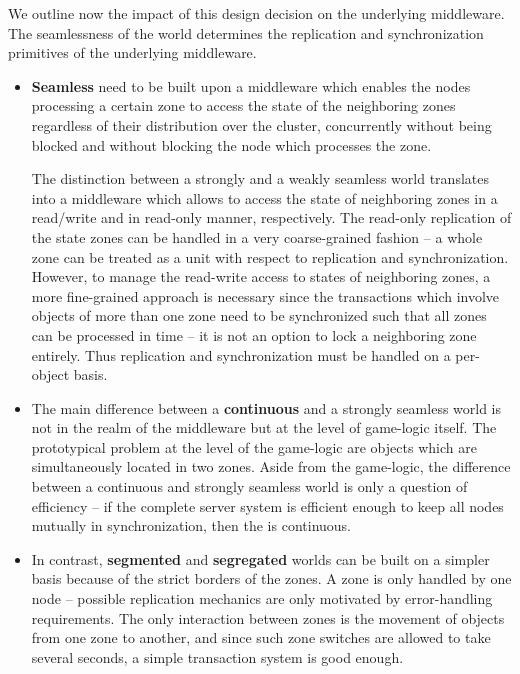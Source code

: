 \documentclass[a4paper, 10pt]{book}
\begin{document}
            We outline now the impact of this design decision on the underlying
            middleware. The seamlessness of the world determines the replication
            and synchronization primitives of the underlying middleware. 
            \begin{itemize}
                \item {\bf Seamless} \MMORGS need to be built upon a
                    middleware which enables the nodes processing a certain zone to access
                    the state of the neighboring zones regardless of their distribution
                    over the cluster, concurrently without being blocked and without
                    blocking the node which processes the zone.

                    The distinction between a strongly and a weakly seamless world
                    translates into a middleware which allows to access the state of
                    neighboring zones in a read/write and in read-only manner,
                    respectively.
                    The read-only replication of the state zones can be handled in a
                    very coarse-grained fashion -- a whole zone can be treated as a unit
                    with respect to replication and synchronization.\\
                    However, to manage the read-write access to states of neighboring
                    zones, a more fine-grained approach is necessary since the
                    transactions which involve objects of more than one zone need to be
                    synchronized such that all zones can be processed in time -- it is
                    not an option to lock a neighboring zone entirely. Thus replication
                    and synchronization must be handled on a per-object basis.
                \item The main difference between a \textbf{continuous} and a strongly
                    seamless world is not in the realm of the middleware but at the
                    level of game-logic itself.  The prototypical problem at the level
                    of the game-logic are objects which are simultaneously located in
                    two zones.
                    Aside from the game-logic, the difference between a continuous and
                    strongly seamless world is only a question of efficiency -- if the
                    complete server system is efficient enough to keep all nodes
                    mutually in synchronization, then the \MMORG is continuous.
                \item In contrast, \textbf{segmented} and \textbf{segregated} worlds
                    can be built on a simpler basis because of the strict borders of the
                    zones. A zone is only handled by one node -- possible replication
                    mechanics are only motivated by error-handling requirements. The
                    only interaction between zones is the movement of objects from one
                    zone to another, and since such zone switches are allowed to take
                    several seconds, a simple transaction system is good enough.


\end{itemize}
\end{document}
